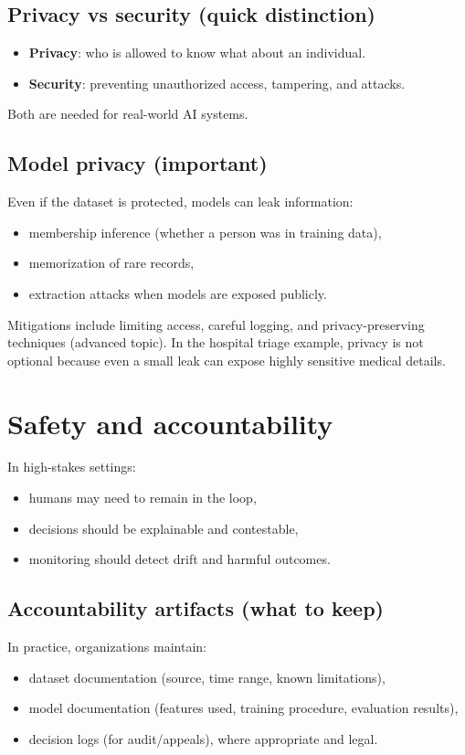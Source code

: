 \documentclass[11pt]{article}
\begin{document}
\subsection{Privacy vs security (quick distinction)}
\begin{itemize}[leftmargin=*]
  \item \textbf{Privacy}: who is allowed to know what about an individual.
  \item \textbf{Security}: preventing unauthorized access, tampering, and attacks.
\end{itemize}
Both are needed for real-world AI systems.

\subsection{Model privacy (important)}
Even if the dataset is protected, models can leak information:
\begin{itemize}[leftmargin=*]
  \item membership inference (whether a person was in training data),
  \item memorization of rare records,
  \item extraction attacks when models are exposed publicly.
\end{itemize}
Mitigations include limiting access, careful logging, and privacy-preserving techniques (advanced topic).
In the hospital triage example, privacy is not optional because even a small leak can expose highly sensitive medical details.

\section{Safety and accountability}
In high-stakes settings:
\begin{itemize}[leftmargin=*]
  \item humans may need to remain in the loop,
  \item decisions should be explainable and contestable,
  \item monitoring should detect drift and harmful outcomes.
\end{itemize}

\subsection{Accountability artifacts (what to keep)}
In practice, organizations maintain:
\begin{itemize}[leftmargin=*]
  \item dataset documentation (source, time range, known limitations),
  \item model documentation (features used, training procedure, evaluation results),
  \item decision logs (for audit/appeals), where appropriate and legal.
\end{itemize}
\end{document}
